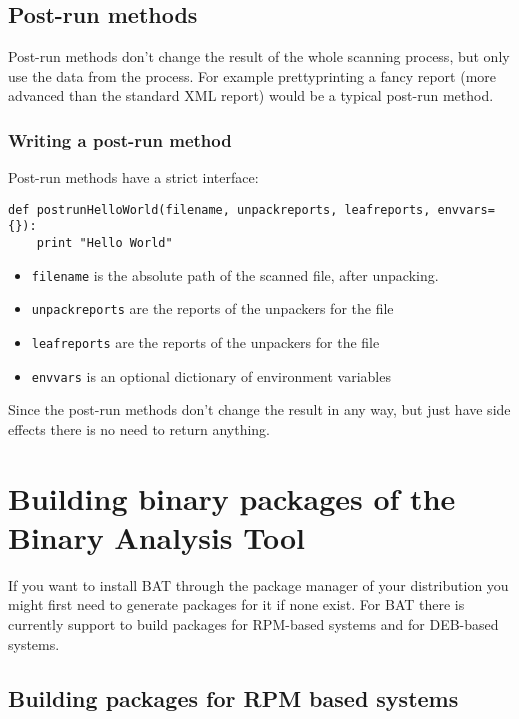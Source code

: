 \documentclass[10pt]{article}
\begin{document}
\subsection{Post-run methods}

Post-run methods don't change the result of the whole scanning process, but
only use the data from the process. For example prettyprinting a fancy report
(more advanced than the standard XML report) would be a typical post-run
method.

\subsubsection{Writing a post-run method}

Post-run methods have a strict interface:

\begin{verbatim}
def postrunHelloWorld(filename, unpackreports, leafreports, envvars={}):
	print "Hello World"
\end{verbatim}

\begin{itemize}
\item \texttt{filename} is the absolute path of the scanned file, after
unpacking.
\item \texttt{unpackreports} are the reports of the unpackers for the file
\item \texttt{leafreports} are the reports of the unpackers for the file
\item \texttt{envvars} is an optional dictionary of environment variables
\end{itemize}

Since the post-run methods don't change the result in any way, but just have
side effects there is no need to return anything.

\section{Building binary packages of the Binary Analysis Tool}

If you want to install BAT through the package manager of your distribution you
might first need to generate packages for it if none exist. For BAT there is
currently support to build packages for RPM-based systems and for DEB-based
systems.

\subsection{Building packages for RPM based systems}
\end{document}
